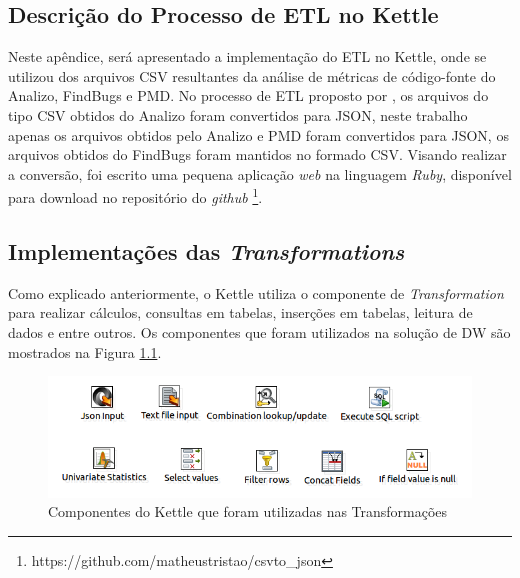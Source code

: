 \begin{apendicesenv}

\chapter{Descrição do Processo de ETL no Kettle}
\label{sec:implementação-etl}

Neste apêndice, será apresentado a implementação do ETL no Kettle, onde se utilizou dos arquivos CSV resultantes da análise de métricas de código-fonte do Analizo, FindBugs e PMD.
No processo de ETL proposto por , os arquivos do tipo CSV obtidos do Analizo foram convertidos para JSON, neste trabalho apenas os arquivos obtidos pelo Analizo e PMD foram convertidos para JSON, os arquivos obtidos do FindBugs foram mantidos no formado CSV. Visando realizar a conversão, foi escrito uma pequena aplicação \textit{web} na linguagem \textit{Ruby}, disponível para download no repositório do \textit{github} \footnote{https://github.com/matheustristao/csvto\_json}. 


\section{Implementações das \textit{Transformations}}


Como explicado anteriormente, o Kettle utiliza o componente de \textit{Transformation} para realizar cálculos, consultas em tabelas, inserções em tabelas, leitura de dados e entre outros. Os componentes que foram utilizados na solução de DW são mostrados na Figura \ref{fig:componentsetl}.


\begin{figure}[h!]
\centering
\includegraphics[keepaspectratio=false,scale=0.6]{figuras/figuras_nilton/componentsetl.png}
\caption{Componentes do Kettle que foram utilizadas nas Transformações}
\label{fig:componentsetl}
\end{figure}


\end{apendicesenv}
